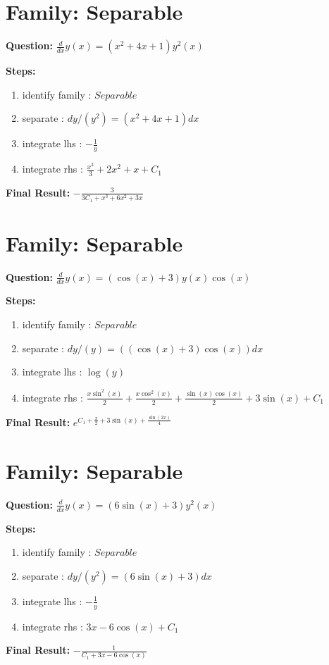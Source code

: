 \documentclass{article}
\begin{document}
\section*{Family: Separable}
\textbf{Question:} $\frac{d}{d x} y{\left(x \right)} = \left(x^{2} + 4 x + 1\right) y^{2}{\left(x \right)}$

\textbf{Steps:}
\begin{enumerate}
\item identify family :  $Separable$
\item separate :  $dy / (y^{2}) = (x^{2} + 4 x + 1) dx$
\item integrate lhs :  $- \frac{1}{y}$
\item integrate rhs :  $\frac{x^{3}}{3} + 2 x^{2} + x + C_1$
\end{enumerate}
\textbf{Final Result:} $- \frac{3}{3 C_{1} + x^{3} + 6 x^{2} + 3 x}$

\section*{Family: Separable}
\textbf{Question:} $\frac{d}{d x} y{\left(x \right)} = \left(\cos{\left(x \right)} + 3\right) y{\left(x \right)} \cos{\left(x \right)}$

\textbf{Steps:}
\begin{enumerate}
\item identify family :  $Separable$
\item separate :  $dy / (y) = (\left(\cos{\left(x \right)} + 3\right) \cos{\left(x \right)}) dx$
\item integrate lhs :  $\log{\left(y \right)}$
\item integrate rhs :  $\frac{x \sin^{2}{\left(x \right)}}{2} + \frac{x \cos^{2}{\left(x \right)}}{2} + \frac{\sin{\left(x \right)} \cos{\left(x \right)}}{2} + 3 \sin{\left(x \right)} + C_1$
\end{enumerate}
\textbf{Final Result:} $e^{C_{1} + \frac{x}{2} + 3 \sin{\left(x \right)} + \frac{\sin{\left(2 x \right)}}{4}}$

\section*{Family: Separable}
\textbf{Question:} $\frac{d}{d x} y{\left(x \right)} = \left(6 \sin{\left(x \right)} + 3\right) y^{2}{\left(x \right)}$

\textbf{Steps:}
\begin{enumerate}
\item identify family :  $Separable$
\item separate :  $dy / (y^{2}) = (6 \sin{\left(x \right)} + 3) dx$
\item integrate lhs :  $- \frac{1}{y}$
\item integrate rhs :  $3 x - 6 \cos{\left(x \right)} + C_1$
\end{enumerate}
\textbf{Final Result:} $- \frac{1}{C_{1} + 3 x - 6 \cos{\left(x \right)}}$
\end{document}
